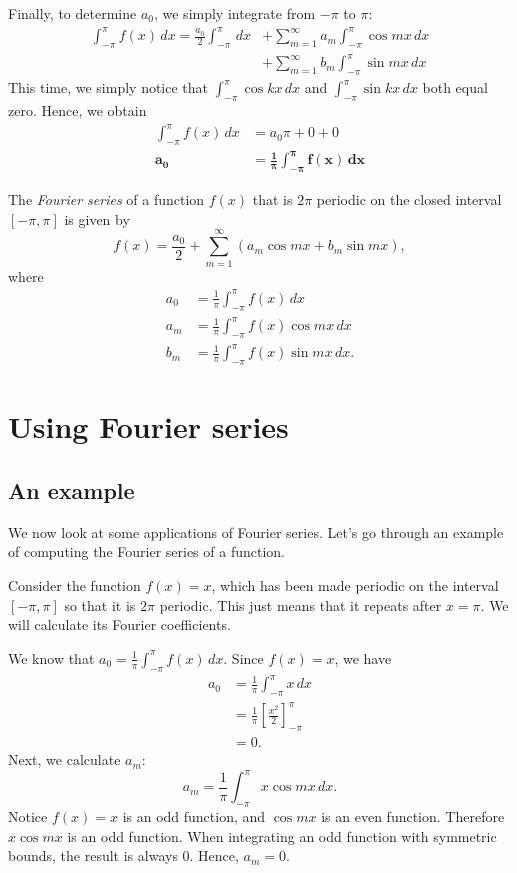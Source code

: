 \documentclass{amsart}
\begin{document}
  Finally, to determine $a_0$, we simply integrate from $-\pi$ to $\pi$:
  \begin{align*}
    \int_{-\pi}^{\pi} f(x)\, dx = \frac{a_0}{2} \int_{-\pi}^{\pi} \, dx &+ \sum_{m=1}^{\infty} a_m \int_{-\pi}^{\pi} \cos mx\, dx \\
                                &+ \sum_{m=1}^{\infty} b_m \int_{-\pi}^{\pi} \sin mx\, dx 
  \end{align*}
  This time, we simply notice that $\int_{-\pi}^{\pi} \cos kx\, dx $ and $\int_{-\pi}^{\pi} \sin kx\, dx$ both equal zero. Hence, we obtain 
  \begin{align*}
    \int_{-\pi}^{\pi} f(x) \, dx &= a_0 \pi + 0 + 0 \\
    \bm{a_0} &\bm{= \frac{1}{\pi} \int_{-\pi}^{\pi} f(x) \, dx} 
  \end{align*}
  \begin{definition}
    The \emph{Fourier series} of a function $f(x)$ that is $2\pi$ periodic on the closed interval  $[-\pi, \pi]$ is given by \[
      f(x) = \frac{a_0}{2} + \sum_{m=1}^{\infty} (a_m \cos mx + b_m \sin mx)
    ,\] where 
    \begin{align*}
      a_0 &= \frac{1}{\pi}\int_{-\pi}^{\pi} f(x)\, dx \\
      a_m &= \frac{1}{\pi}\int_{-\pi}^{\pi} f(x)\cos mx\, dx \\
      b_m &= \frac{1}{\pi}\int_{-\pi}^{\pi} f(x)\sin mx\, dx.
    \end{align*}
  \end{definition}

  \section{Using Fourier series}
  \subsection{An example}

  We now look at some applications of Fourier series. Let's go through an example of computing the Fourier series of a function.

  Consider the function $f(x) = x$, which has been made periodic on the interval $[-\pi, \pi]$ so that it is $2\pi$ periodic. This just means that it repeats after $x = \pi$. We will calculate its Fourier coefficients.

  We know that $a_0 = \frac{1}{\pi} \int_{-\pi}^{\pi} f(x) \, dx$. Since $f(x) = x$, we have 
  \begin{align*}
    a_0 &= \frac{1}{\pi} \int_{-\pi}^{\pi} x\, dx \\
        &= \frac{1}{\pi} \left[ \frac{x^2}{2} \right]_{-\pi}^{\pi} \\
        &= 0.
  \end{align*}
  Next, we calculate $a_m$:
  \begin{equation*}
    a_m = \frac{1}{\pi} \int_{-\pi}^{\pi} x\cos mx \, dx.
  \end{equation*}
  Notice $f(x) = x$ is an odd function, and $\cos mx$ is an even function. Therefore $x\cos mx$ is an odd function. When integrating an odd function with symmetric bounds, the result is always 0. Hence, $a_m = 0$.
\end{document}
